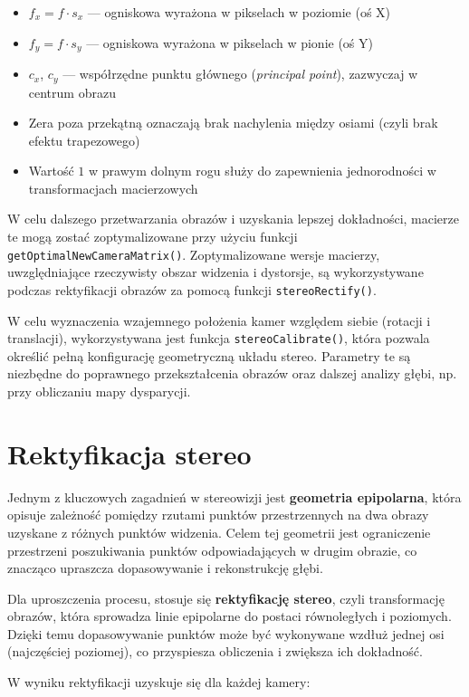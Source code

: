 \documentclass[magisterska]{pracadypl}
\begin{document}
\begin{itemize}
  \item $f_x = f \cdot s_x$ — ogniskowa wyrażona w pikselach w poziomie (oś X)
  \item $f_y = f \cdot s_y$ — ogniskowa wyrażona w pikselach w pionie (oś Y)
  \item $c_x$, $c_y$ — współrzędne punktu głównego (\textit{principal point}), zazwyczaj w centrum obrazu
  \item Zera poza przekątną oznaczają brak nachylenia między osiami (czyli brak efektu trapezowego)
  \item Wartość $1$ w prawym dolnym rogu służy do zapewnienia jednorodności w transformacjach macierzowych
\end{itemize}

W celu dalszego przetwarzania obrazów i uzyskania lepszej dokładności, macierze te mogą zostać zoptymalizowane przy użyciu funkcji \texttt{getOptimalNewCameraMatrix()}. Zoptymalizowane wersje macierzy, uwzględniające rzeczywisty obszar widzenia i dystorsje, są wykorzystywane podczas rektyfikacji obrazów za pomocą funkcji \texttt{stereoRectify()}.

W celu wyznaczenia wzajemnego położenia kamer względem siebie (rotacji i translacji), wykorzystywana jest funkcja \texttt{stereoCalibrate()}, która pozwala określić pełną konfigurację geometryczną układu stereo. Parametry te są niezbędne do poprawnego przekształcenia obrazów oraz dalszej analizy głębi, np. przy obliczaniu mapy dysparycji.

\section{Rektyfikacja stereo}

Jednym z kluczowych zagadnień w stereowizji jest \textbf{geometria epipolarna}, która opisuje zależność pomiędzy rzutami punktów przestrzennych na dwa obrazy uzyskane z różnych punktów widzenia. Celem tej geometrii jest ograniczenie przestrzeni poszukiwania punktów odpowiadających w drugim obrazie, co znacząco upraszcza dopasowywanie i rekonstrukcję głębi.

Dla uproszczenia procesu, stosuje się \textbf{rektyfikację stereo}, czyli transformację obrazów, która sprowadza linie epipolarne do postaci równoległych i poziomych. Dzięki temu dopasowywanie punktów może być wykonywane wzdłuż jednej osi (najczęściej poziomej), co przyspiesza obliczenia i zwiększa ich dokładność.

W wyniku rektyfikacji uzyskuje się dla każdej kamery:
\end{document}
